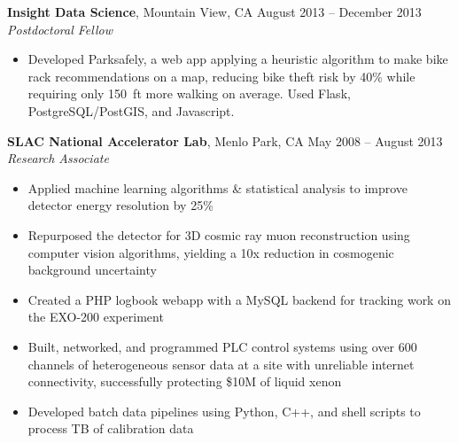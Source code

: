 \documentclass[margin,line]{resume}
\begin{document}
\begin{resume}
\begin{itemize}
    \end{itemize}
    \textbf{Insight Data Science}, Mountain View, CA \hfill August 2013 -- December 2013\vspace{1mm}\\\vspace{1mm}%
    \textsl{Postdoctoral Fellow}
    \begin{itemize}
    \item Developed Parksafely, a web app applying a heuristic algorithm to make bike rack recommendations on a map, reducing bike theft risk by 40\% while requiring only 150~ft more walking on average. Used Flask, PostgreSQL/PostGIS, and Javascript.
    \end{itemize}

    \textbf{SLAC National Accelerator Lab}, Menlo Park, CA \hfill May 2008 -- August 2013\vspace{1mm}\\\vspace{1mm}%
    \textsl{Research Associate}
    \begin{itemize}
    \item Applied machine learning algorithms \& statistical analysis to improve detector energy resolution by 25\%
    \item Repurposed the detector for 3D cosmic ray muon reconstruction using computer vision algorithms, yielding a 10x reduction in cosmogenic background uncertainty
    \item Created a PHP logbook webapp with a MySQL backend for tracking work on the EXO-200 experiment
    \item Built, networked, and programmed PLC control systems using over 600 channels of heterogeneous sensor data at a site with unreliable internet connectivity, successfully protecting \$10M of liquid xenon
    \item Developed batch data pipelines using Python, C++, and shell scripts to process TB of calibration data
    \end{itemize}



\end{resume}
\end{document}
